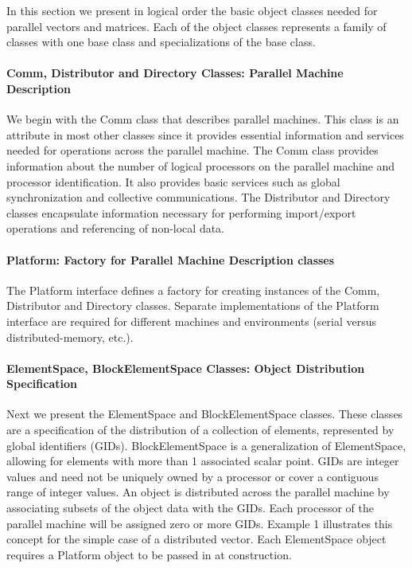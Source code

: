\documentclass[10pt,relax]{PetraObjectModel}
\begin{document}
In this section we present in logical order the basic object classes
needed for parallel vectors and matrices.  Each of the object
classes represents a family of classes with one base class and
specializations of the base class.

\paragraph{Comm, Distributor and Directory Classes:  Parallel Machine
 Description}

We begin with the Comm class that describes parallel machines. This
class is an attribute in most other classes since it provides
essential information and services needed for operations across the
parallel machine.  The Comm class provides information about the
number of  logical processors on the parallel machine and processor
identification. It also provides basic services such as global
synchronization and collective communications. The Distributor and
Directory classes encapsulate information necessary for performing
import/export operations and referencing of non-local data.

\paragraph{Platform: Factory for Parallel Machine Description classes}

The Platform interface defines a factory for creating instances of the Comm,
Distributor and Directory classes. Separate implementations of the Platform
interface are required for different machines and environments (serial versus
distributed-memory, etc.).

\paragraph{ElementSpace, BlockElementSpace Classes: Object Distribution Specification}

Next we present the ElementSpace and BlockElementSpace classes.  These classes
are a specification of the distribution of a collection of elements, represented
by global identifiers (GIDs). BlockElementSpace is a generalization of
ElementSpace, allowing for elements with more than 1 associated scalar point.
 GIDs are integer values and need not be uniquely owned by a
processor or cover a contiguous range of integer values.  An object is
distributed across the parallel machine by associating subsets of the
object data with the GIDs.  Each processor of the parallel machine will be
assigned zero or more GIDs.  Example 1 illustrates this concept for the
simple case of a distributed vector.   Each ElementSpace object requires a
Platform object to be passed in at construction.
\end{document}
